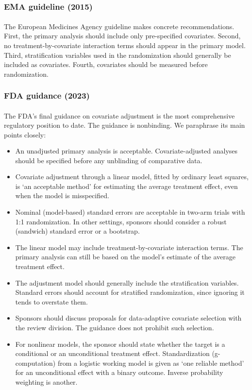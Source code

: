 \documentclass[
  11pt,
]{article}
\providecommand{\tightlist}{%
  \setlength{\itemsep}{0pt}\setlength{\parskip}{0pt}}
\begin{document}
\subsubsection{EMA guideline (2015)}\label{ema-guideline-2015}

The European Medicines Agency guideline\textsuperscript{} makes concrete
recommendations. First, the primary analysis should
include only pre-specified covariates. Second, no
treatment-by-covariate interaction terms should appear
in the primary model. Third, stratification variables
used in the randomization should generally be included
as covariates. Fourth, covariates should be measured
before randomization.

\subsubsection{FDA guidance (2023)}\label{fda-guidance-2023}

The FDA's final guidance on covariate adjustment\textsuperscript{} is the most comprehensive
regulatory position to date. The guidance is
nonbinding. We paraphrase its main points closely:

\begin{itemize}
\tightlist
\item
  An unadjusted primary analysis is acceptable.
  Covariate-adjusted analyses should be specified before
  any unblinding of comparative data.
\item
  Covariate adjustment through a linear model, fitted
  by ordinary least squares, is `an acceptable method'
  for estimating the average treatment effect, even
  when the model is misspecified.
\item
  Nominal (model-based) standard errors are acceptable
  in two-arm trials with 1:1 randomization. In other
  settings, sponsors should consider a robust
  (sandwich) standard error or a bootstrap.
\item
  The linear model may include treatment-by-covariate
  interaction terms. The primary analysis can still be
  based on the model's estimate of the average
  treatment effect.
\item
  The adjustment model should generally include the
  stratification variables. Standard errors should
  account for stratified randomization, since ignoring
  it tends to overstate them.
\item
  Sponsors should discuss proposals for data-adaptive
  covariate selection with the review division. The
  guidance does not prohibit such selection.
\item
  For nonlinear models, the sponsor should state whether
  the target is a conditional or an unconditional
  treatment effect. Standardization (g-computation)
  from a logistic working model is given as `one
  reliable method' for an unconditional effect with a
  binary outcome. Inverse probability weighting is
  another.
\end{itemize}
\end{document}
